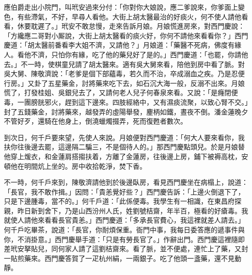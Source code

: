 應伯爵走出小院門，叫玳安過來分付：「你對你大娘說，應二爹說來，你爹面上變色，有些滯氣，不好，早尋人看他。大街上胡太醫最治的好痰火，{}何不使人請他看看，休要耽遲了。」玳安不敢怠慢，走來告訴月娘。月娘慌進房來，對西門慶說：「方纔應二哥對小厮說，大街上胡太醫看的痰火好，你何不請他來看看你？」西門慶道：「胡太醫前番看李大姐不濟，又請他？」月娘道：「藥醫不死病，佛度有緣人。看他不濟，只怕你有緣，吃了他的藥兒好了是的。」{}西門慶道：「也罷，你請他去。」不一時，使棋童兒請了胡太醫來。適有吳大舅來看，陪他到房中看了脈。對吳大舅、陳敬濟說：「老爹是個下部蘊毒，若久而不治，卒成溺血之疾。乃是忍便行房。」又卦了五星藥金，討將藥來吃下去，如石沉大海一般，反溺不出來。月娘慌了，打發桂姐、吳銀兒去了，又請何老人兒子何春泉來看。又說：「是癃閉便毒，一團膀胱邪火，趕到這下邊來。四肢經絡中，又有濕痰流聚，以致心腎不交。」{}封了五錢藥金，討將藥來，越發弄的虛陽舉發，麈柄如鐵，晝夜不倒。潘金蓮晚夕不管好歹，還騎在他身上，倒澆蠟燭掇弄，死而復甦者數次。{}

到次日，何千戶要來望，先使人來說。月娘便對西門慶道：「何大人要來看你，我扶你往後邊去罷，{}這邊隔二騙三，不是個待人的。」那西門慶點頭兒。於是月娘替他穿上煖衣，和金蓮肩搭搊扶着，方離了金蓮房，往後邊上房，鋪下被褥高枕，安頓他在明間炕上坐的。房中收拾乾淨，焚下香。

不一時，何千戶來到，陳敬濟請他到於後邊臥房，看見西門慶坐在病榻上，說道：「長官，我不敢作揖。」因問：「貴恙覺好些？」西門慶告訴：「上邊火倒退下了，只是下邊腫毒，當不的。」何千戶道：「此係便毒。我學生有一相識，在東昌府探親，昨日新到舍下，乃是山西汾州人氏，姓劉號桔齋，年半百，極看的好瘡毒。我就使人請他來看看長官貴恙。」西門慶道：「多承長官費心，我這裡就差人請去。」何千戶吃畢茶，說道：「長官，你耐煩保重。衙門中事，我每日委答應的遞事件與你，不消掛意。」西門慶舉手道：「只是有勞長官了。」作辭出門。西門慶這裡隨即差玳安拏貼兒，同何家人請了這劉桔齋來。看了脈，並不便處，連忙上了藥，又封一貼煎藥來。西門慶答賀了一疋杭州絹，一兩銀子。吃了他頭一盞藥，還不見動靜。

